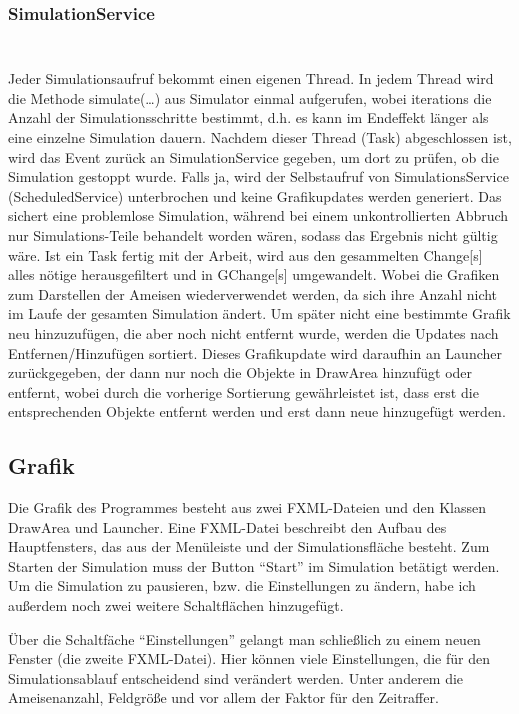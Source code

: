 \documentclass[a4paper,12pt]{scrartcl}
\begin{document}
\subsubsection*{SimulationService}
\begin{lstlisting}

\end{lstlisting}
\begin{lstlisting}

\end{lstlisting}
Jeder Simulationsaufruf bekommt einen eigenen Thread. In jedem Thread wird die Methode simulate(\dots{}) aus Simulator einmal aufgerufen, wobei iterations die Anzahl der Simulationsschritte bestimmt, d.h. es kann im Endeffekt länger als eine einzelne Simulation dauern. Nachdem dieser Thread (Task) abgeschlossen ist, wird das Event zurück an SimulationService gegeben, um dort zu prüfen, ob die Simulation gestoppt wurde. Falls ja, wird der Selbstaufruf von SimulationsService (ScheduledService) unterbrochen und keine Grafikupdates werden generiert. Das sichert eine problemlose Simulation, während bei einem unkontrollierten Abbruch nur Simulations-Teile behandelt worden wären, sodass das Ergebnis nicht gültig wäre.
Ist ein Task fertig mit der Arbeit, wird aus den gesammelten Change[s] alles nötige herausgefiltert und in GChange[s] umgewandelt. Wobei die Grafiken zum Darstellen der Ameisen wiederverwendet werden, da sich ihre Anzahl nicht im Laufe der gesamten Simulation ändert. Um später nicht eine bestimmte Grafik neu hinzuzufügen, die aber noch nicht entfernt wurde, werden die Updates nach Entfernen/Hinzufügen sortiert. Dieses Grafikupdate wird daraufhin an Launcher zurückgegeben, der dann nur noch die Objekte in DrawArea hinzufügt oder entfernt, wobei durch die vorherige Sortierung gewährleistet ist, dass erst die entsprechenden Objekte entfernt werden und erst dann neue hinzugefügt werden.
\subsection*{Grafik}
Die Grafik des Programmes besteht aus zwei FXML-Dateien und den Klassen DrawArea und Launcher.
Eine FXML-Datei beschreibt den Aufbau des Hauptfensters, das aus der Menüleiste und der Simulationsfläche besteht. Zum Starten der Simulation muss der Button "`Start"' im Simulation betätigt werden. Um die Simulation zu pausieren, bzw. die Einstellungen zu ändern, habe ich außerdem noch zwei weitere Schaltflächen hinzugefügt.

Über die Schaltfäche "`Einstellungen"' gelangt man schließlich zu einem neuen Fenster (die zweite FXML-Datei). Hier können viele Einstellungen, die für den Simulationsablauf entscheidend sind verändert werden. Unter anderem die Ameisenanzahl, Feldgröße und vor allem der Faktor für den Zeitraffer.
\end{document}
